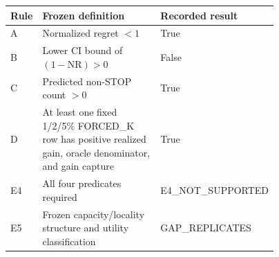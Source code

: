\begin{center}
\begin{minipage}{\linewidth}
\centering
\small
\setlength{\tabcolsep}{4pt}
\label{tab:coco-e4}
\begin{tabular}{lp{0.51\linewidth}p{0.26\linewidth}}
\toprule
Rule & Frozen definition & Recorded result \\
\midrule
A & Normalized regret $<1$ & True \\
B & Lower CI bound of $(1-\mathrm{NR})>0$ & False \\
C & Predicted non-STOP count $>0$ & True \\
D & At least one fixed 1/2/5\% FORCED\_K row has positive realized gain, oracle denominator, and gain capture & True \\
E4 & All four predicates required & E4\_NOT\_SUPPORTED \\
E5 & Frozen capacity/locality structure and utility classification & GAP\_REPLICATES \\
\bottomrule
\end{tabular}
\end{minipage}
\end{center}
